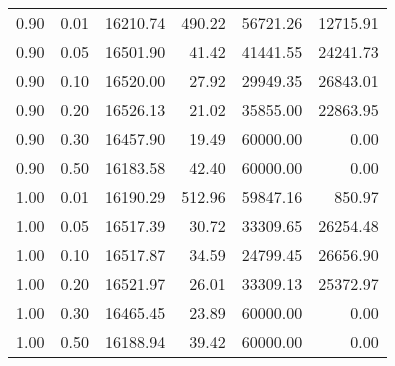 \begin{table}
\begin{tabular}{rrrrrr}
0.90 & 0.01 & 16210.74 & 490.22 & 56721.26 & 12715.91 \\
0.90 & 0.05 & 16501.90 & 41.42 & 41441.55 & 24241.73 \\
0.90 & 0.10 & 16520.00 & 27.92 & 29949.35 & 26843.01 \\
0.90 & 0.20 & 16526.13 & 21.02 & 35855.00 & 22863.95 \\
0.90 & 0.30 & 16457.90 & 19.49 & 60000.00 & 0.00 \\
0.90 & 0.50 & 16183.58 & 42.40 & 60000.00 & 0.00 \\
1.00 & 0.01 & 16190.29 & 512.96 & 59847.16 & 850.97 \\
1.00 & 0.05 & 16517.39 & 30.72 & 33309.65 & 26254.48 \\
1.00 & 0.10 & 16517.87 & 34.59 & 24799.45 & 26656.90 \\
1.00 & 0.20 & 16521.97 & 26.01 & 33309.13 & 25372.97 \\
1.00 & 0.30 & 16465.45 & 23.89 & 60000.00 & 0.00 \\
1.00 & 0.50 & 16188.94 & 39.42 & 60000.00 & 0.00 \\
\bottomrule
\end{tabular}
\end{table}
